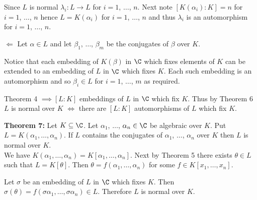 Since $L$ is normal $\lambda_i\colon L\to L$ for $i=1$, $\dotsc$, $n$.  Next note $[K(\alpha_i):K]=n$ for $i=1$, $\dotsc$, $n$ hence $L=K(\alpha_i)$ for $i=1$, $\dotsc$, $n$ and thus $\lambda_i$ is an automorphism for $i=1$, $\dotsc$, $n$.

$\Leftarrow$ Let $\alpha\in L$ and let $\beta_1$, $\dotsc$, $\beta_m$ be the conjugates of $\beta$ over $K$.

Notice that each embedding of $K(\beta)$ in $\C$ which fixes elements of $K$ can be extended to an embedding of $L$ in $\C$ which fixes $K$.  Each such embedding is an automorphism and so $\beta_i\in L$ for $i=1$, $\dotsc$, $m$ as required.

\remark Theorem 4 $\implies[L:K]$ embeddings of $L$ in $\C$ which fix $K$.
Thus by Theorem 6 $L$ is normal over $K$ $\iff$ there are $[L:K]$ automorphisms of $L$ which fix $K$.

\textbf{Theorem 7:} Let $K\subseteq\C$.  Let $\alpha_1$, $\dotsc$, $\alpha_n\in\C$ be algebraic over $K$.  Put $L=K(\alpha_1,\dotsc,\alpha_n)$.  If $L$ contains the conjugates of $\alpha_1$, $\dotsc$, $\alpha_n$ over $K$ then $L$ is normal over $K$. \\
\pf We have $K(\alpha_1,\dotsc,\alpha_n)=K[\alpha_1,\dotsc,\alpha_n]$.  Next by Theorem 5 there exists $\theta\in L$ such that $L=K[\theta]$.  Then $\theta=f(\alpha_1,\dotsc,\alpha_n)$ for some $f\in K[x_1,\dotsc,x_n]$.

Let $\sigma$ be an embedding of $L$ in $\C$ which fixes $K$.  Then $\sigma(\theta)=f(\sigma\alpha_1,\dotsc,\sigma\alpha_n)\in L$.  Therefore $L$ is normal over $K$.